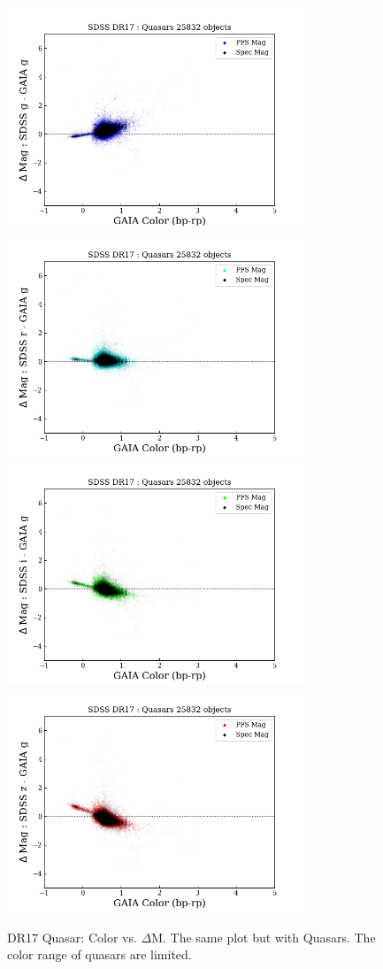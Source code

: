 \documentclass[apj,twocolumn]{aastex631}
\begin{document}
\begin{figure}%
\begin{center}
\includegraphics[angle=0,width=8.9cm]{figures/20220812_color_dmag_g_dr17quasar.png}
\includegraphics[angle=0,width=8.9cm]{figures/20220812_color_dmag_r_dr17quasar.png}
\includegraphics[angle=0,width=8.9cm]{figures/20220812_color_dmag_i_dr17quasar.png}
\includegraphics[angle=0,width=8.9cm]{figures/20220812_color_dmag_z_dr17quasar.png}
\caption{DR17 Quasar: Color vs. $\Delta$M.  The same plot but with Quasars.  The color range of quasars are limited.}
\end{center}
\end{figure}
\end{document}
